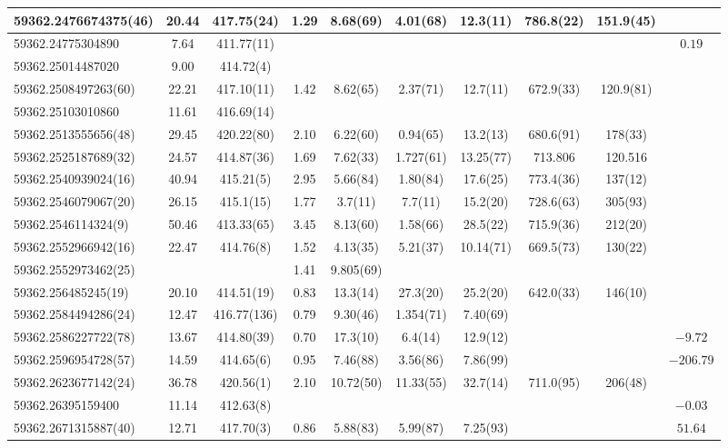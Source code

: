 {{\begin{longtable}{lccccccccc}
\hline
59362.2476674375(46) & 20.44 & 417.75(24) & 1.29 & 8.68(69) & 4.01(68)  & 12.3(11) & 786.8(22) & 151.9(45) &  \\
\hline
59362.24775304890 & 7.64 & 411.77(11) &  &  &  &    &  &  & $0.19$ \\
\hline
59362.25014487020 & 9.00 & 414.72(4) &  &  &  &    &  &  &  \\
\hline
59362.2508497263(60) & 22.21 & 417.10(11) & 1.42 & 8.62(65) & 2.37(71)  & 12.7(11) & 672.9(33) & 120.9(81) &  \\
\hline
59362.25103010860 & 11.61 & 416.69(14) &  &  &    &  &  &  &  \\
\hline
59362.2513555656(48) & 29.45 & 420.22(80) & 2.10 & 6.22(60) & 0.94(65)  & 13.2(13) & 680.6(91) & 178(33) &  \\
\hline
59362.2525187689(32) & 24.57 & 414.87(36) & 1.69 & 7.62(33) & 1.727(61)  & 13.25(77) & 713.806 & 120.516 &  \\
\hline
59362.2540939024(16) & 40.94 & 415.21(5) & 2.95 & 5.66(84) & 1.80(84)  & 17.6(25) & 773.4(36) & 137(12) &  \\
\hline
59362.2546079067(20) & 26.15 & 415.1(15) & 1.77 & 3.7(11) & 7.7(11)  & 15.2(20) & 728.6(63) & 305(93) &  \\
\hline
59362.2546114324(9) & 50.46 & 413.33(65) & 3.45 & 8.13(60) & 1.58(66) & 28.5(22) & 715.9(36) & 212(20) &  \\
\hline
59362.2552966942(16) & 22.47 & 414.76(8) & 1.52 & 4.13(35) & 5.21(37)  & 10.14(71) & 669.5(73) & 130(22) &  \\
59362.2552973462(25)  &  & & 1.41 & 9.805(69) &  &   &  &  &  \\
\hline
59362.256485245(19) & 20.10 & 414.51(19) & 0.83 & 13.3(14) & 27.3(20)  & 25.2(20) & 642.0(33) & 146(10) &  \\
\hline
59362.2584494286(24) & 12.47 & 416.77(136) & 0.79 & 9.30(46) & 1.354(71)  & 7.40(69) &  &  &  \\
\hline
59362.2586227722(78) & 13.67 & 414.80(39) & 0.70 & 17.3(10) & 6.4(14)  & 12.9(12) &  &  & $-9.72$ \\
\hline
59362.2596954728(57) & 14.59 & 414.65(6) & 0.95 & 7.46(88) & 3.56(86)  & 7.86(99) &  &  & $-206.79$ \\
\hline
59362.2623677142(24) & 36.78 & 420.56(1) & 2.10 & 10.72(50) & 11.33(55)  & 32.7(14) & 711.0(95) & 206(48) &  \\
\hline
59362.26395159400 & 11.14 & 412.63(8) &  &  &    &  &  &  & $-0.03$ \\
\hline
59362.2671315887(40) & 12.71 & 417.70(3) & 0.86 & 5.88(83) & 5.99(87)  & 7.25(93) &  &  & $51.64$ \\

\end{longtable}}}
